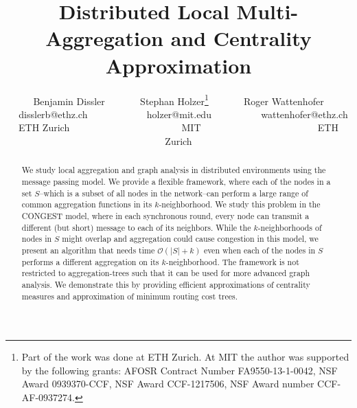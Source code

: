 \documentclass[11pt]{article}
\newcommand{\BO}{\mathcal{O}}
\newif\iffull
\begin{document}
\author{Benjamin Dissler ~~~~~~  Stephan Holzer\thanks{Part of the work was done at ETH Zurich. At MIT the author was supported by the following grants: AFOSR Contract Number FA9550-13-1-0042, NSF Award 0939370-CCF, NSF Award CCF-1217506, NSF Award number CCF-AF-0937274.}  ~~~~~~ Roger Wattenhofer\\
~~\small disslerb@ethz.ch ~~~~~~~~~~~ \small holzer@mit.edu  ~~~~~~~~~  \small wattenhofer@ethz.ch\\
  \small ETH Zurich  ~~~~~~~~~~~~~~~~~~~~~~  MIT  ~~~~~~~~~~~~~~~~~~~~~~~  ETH Zurich\\
}

\title{
Distributed Local Multi-Aggregation and Centrality Approximation
}
\maketitle
\thispagestyle{empty}
\begin{abstract}
We study local aggregation and graph analysis in distributed environments using the message passing model. We provide a flexible framework, where each of the nodes in a set $S$--which is a subset of all nodes in the network--can perform a large range of common aggregation functions in its $k$-neighborhood. We study this problem in the CONGEST model, where in each synchronous round, every node can transmit a different (but short) message to each of its neighbors. While the $k$-neighborhoods of nodes in $S$ might overlap and aggregation could cause congestion in this model, we present an algorithm that needs time $\BO(|S|+k)$ even when each of the nodes in $S$ performs a different aggregation on its $k$-neighborhood. The framework is not restricted to aggregation-trees such that it can be used for more advanced graph analysis. We demonstrate this by providing efficient approximations of centrality measures and approximation of minimum routing cost trees.
\end{abstract}

\clearpage
\pagestyle{plain}
\setcounter{page}{1}






\newpage
\fulltrue 
\end{document}
